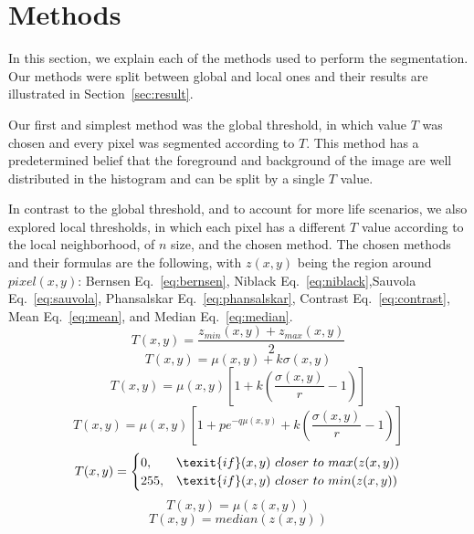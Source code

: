 \documentclass[conference]{IEEEtran}
\begin{document}
\section{Methods}
\label{sec:method}
In this section, we explain each of the methods used to perform the segmentation. Our methods were split between global and local ones and their results are illustrated in Section~\ref{sec:result}.\par
Our first and simplest method was the global threshold, in which value $T$ was chosen and every pixel was segmented according to $T$. This method has a predetermined belief that the foreground and background of the image are well distributed in the histogram and can be split by a single $T$ value.\par
In contrast to the global threshold, and to account for more life scenarios, we also explored local thresholds, in which each pixel has a different $T$ value according to the local neighborhood, of $n$ size, and the chosen method. The chosen methods and their formulas are the following, with $z(x, y)$ being the region around $pixel(x, y)$: Bernsen Eq.~\ref{eq:bernsen}, Niblack Eq.~\ref{eq:niblack},Sauvola Eq.~\ref{eq:sauvola}, Phansalskar Eq.~\ref{eq:phansalskar}, Contrast Eq.~\ref{eq:contrast}, Mean Eq.~\ref{eq:mean}, and Median Eq.~\ref{eq:median}.
\begin{equation}
\label{eq:bernsen}
    T(x, y) = \frac{z_{min}(x, y) + z_{max}(x, y)}{2}
\end{equation}
\begin{equation}
\label{eq:niblack}
    T(x, y) = \mu(x, y) + k \sigma(x, y)
\end{equation}
\begin{equation}
\label{eq:sauvola}
    T(x, y) = \mu(x, y) \left[ 1 + k \left(\frac{\sigma(x, y)}{r} - 1\right)\right]
\end{equation}
\begin{equation}
\label{eq:phansalskar}
    T(x, y) = \mu(x, y) \left[ 1 + p e^{-q\mu(x, y)} + k \left( \frac{\sigma(x, y)}{r} - 1 \right) \right]
\end{equation}
\begin{equation}
\label{eq:contrast}
    T(x, y) =
    \begin{cases}
    0,& \texit{if} (x, y)\ closer\ to\ max(z(x, y))\\
    255,& \texit{if} (x, y)\ closer\ to\ min(z(x, y))
    \end{cases}
\end{equation}
\begin{equation}
\label{eq:mean}
    T(x, y) = \mu(z(x, y))
\end{equation}
\begin{equation}
\label{eq:median}
    T(x, y) = median(z(x, y))
\end{equation}
\end{document}
